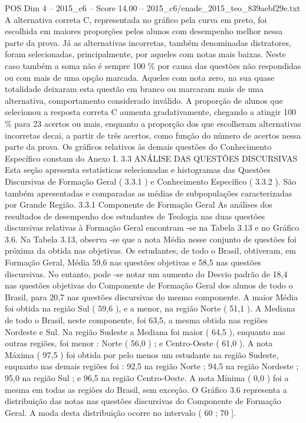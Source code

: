 \begin{textsample}{POS Dim 4 – 2015\_c6 – Score 14.00 – 2015\_c6/enade\_2015\_teo\_839aebf29e.txt}
A alternativa correta C, representada no gráfico pela curva em preto, foi escolhida em maiores proporções pelos alunos com desempenho melhor nessa parte da prova.
Já as alternativas incorretas, também denominadas distratores, foram selecionadas, principalmente, por aqueles com notas mais baixas.
Neste caso também a soma não é sempre 100 \% por causa das questões não respondidas ou com mais de uma opção marcada.
Aqueles com nota zero, na sua quase totalidade deixaram esta questão em branco ou marcaram mais de uma alternativa, comportamento considerado inválido.
A proporção de alunos que selecionou a resposta correta C aumenta gradativamente, chegando a atingir 100 \% para 23 acertos ou mais, enquanto a proporção dos que escolheram alternativas incorretas decai, a partir de três acertos, como função do número de acertos nessa parte da prova.
Os gráficos relativos às demais questões do Conhecimento Específico constam do Anexo I. 3.3 ANÁLISE DAS QUESTÕES DISCURSIVAS Esta seção apresenta estatísticas selecionadas e histogramas das Questões Discursivas de Formação Geral ( 3.3.1 ) e Conhecimento Específico ( 3.3.2 ).
São também apresentadas e comparadas as médias de subpopulações caracterizadas por Grande Região. 3.3.1 Componente de Formação Geral As análises dos resultados de desempenho dos estudantes de Teologia nas duas questões discursivas relativas à Formação Geral encontram -se na Tabela 3.13 e no Gráfico 3.6.
Na Tabela 3.13, observa -se que a nota Média nesse conjunto de questões foi próxima da obtida nas objetivas.
Os estudantes, de todo o Brasil, obtiveram, em Formação Geral, Média 59,6 nas questões objetivas e 58,5 nas questões discursivas.
No entanto, pode -se notar um aumento do Desvio padrão de 18,4 nas questões objetivas do Componente de Formação Geral dos alunos de todo o Brasil, para 20,7 nas questões discursivas do mesmo componente.
A maior Média foi obtida na região Sul ( 59,6 ), e a menor, na região Norte ( 51,1 ).
A Mediana de todo o Brasil, neste componente, foi 63,5, a mesma obtida nas regiões Nordeste e Sul.
Na região Sudeste a Mediana foi maior ( 64,5 ), enquanto nas outras regiões, foi menor : Norte ( 56,0 ) ; e Centro-Oeste ( 61,0 ).
A nota Máxima ( 97,5 ) foi obtida por pelo menos um estudante na região Sudeste, enquanto nas demais regiões foi : 92,5 na região Norte ; 94,5 na região Nordeste ; 95,0 na região Sul ; e 96,5 na região Centro-Oeste.
A nota Mínima ( 0,0 ) foi a mesma em todas as regiões do Brasil, sem exceção.
O Gráfico 3.6 representa a distribuição das notas nas questões discursivas do Componente de Formação Geral.
A moda desta distribuição ocorre no intervalo ( 60 ; 70 ].

\end{textsample}
